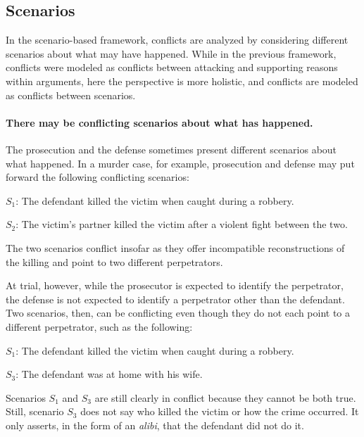 \documentclass[10pt]{article}
\begin{document}
\subsection{Scenarios}

In the scenario-based framework, conflicts 
are analyzed by considering different scenarios about what may have happened. While in the previous framework, conflicts were 
modeled as conflicts between attacking and supporting reasons within arguments, 
here the perspective is more holistic, and conflicts 
are modeled as conflicts between scenarios.

 \paragraph{There may be conflicting scenarios about what has happened.} 
The prosecution and the defense sometimes present different scenarios 
about what happened. In a murder case, for example, prosecution and defense 
may put forward the following conflicting scenarios:
%
\begin{description}
	\item $S_1$: The defendant killed the victim when caught during a robbery.
	\item $S_2$: The victim's partner killed the victim after a violent fight between the two.
\end{description}
%
The two scenarios conflict insofar as they offer 
incompatible reconstructions of the killing 
and point to two different perpetrators.

At trial, however, while the prosecutor is expected to identify the perpetrator, the defense is not expected 
to identify a perpetrator other than the defendant. Two scenarios, then, can be conflicting 
even though they do not each point to a different perpetrator, such as the following:
%
\begin{description}
	\item $S_1$: The defendant killed the victim when caught during a robbery.
	\item $S_3$: The defendant was at home with his wife.	
\end{description}
%
Scenarios $S_1$ and $S_3$ are still clearly in conflict because they cannot be both true. 
Still, scenario $S_3$ does not say who killed the victim or how the crime occurred. 
It only asserts, in the form of an \textit{alibi}, that the defendant did not do it.
\end{document}
